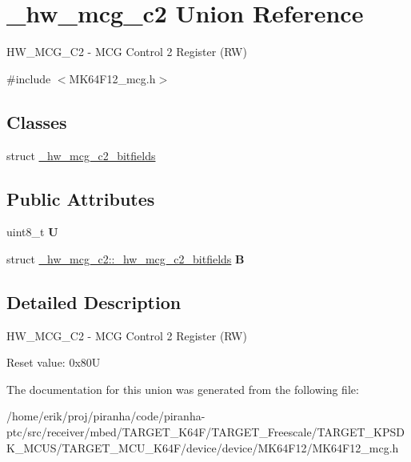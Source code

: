 \hypertarget{union__hw__mcg__c2}{}\section{\+\_\+hw\+\_\+mcg\+\_\+c2 Union Reference}
\label{union__hw__mcg__c2}


H\+W\+\_\+\+M\+C\+G\+\_\+\+C2 -\/ M\+CG Control 2 Register (RW)  




{\ttfamily \#include $<$M\+K64\+F12\+\_\+mcg.\+h$>$}

\subsection*{Classes}
\begin{DoxyCompactItemize}
\item 
struct \hyperlink{struct__hw__mcg__c2_1_1__hw__mcg__c2__bitfields}{\+\_\+hw\+\_\+mcg\+\_\+c2\+\_\+bitfields}
\end{DoxyCompactItemize}
\subsection*{Public Attributes}
\begin{DoxyCompactItemize}
\item 
uint8\+\_\+t {\bfseries U}\hypertarget{union__hw__mcg__c2_a11374059289d54ea6eb94f342826163e}{}\label{union__hw__mcg__c2_a11374059289d54ea6eb94f342826163e}

\item 
struct \hyperlink{struct__hw__mcg__c2_1_1__hw__mcg__c2__bitfields}{\+\_\+hw\+\_\+mcg\+\_\+c2\+::\+\_\+hw\+\_\+mcg\+\_\+c2\+\_\+bitfields} {\bfseries B}\hypertarget{union__hw__mcg__c2_a8e1b52b5548fedccdd27eeac436d4e11}{}\label{union__hw__mcg__c2_a8e1b52b5548fedccdd27eeac436d4e11}

\end{DoxyCompactItemize}


\subsection{Detailed Description}
H\+W\+\_\+\+M\+C\+G\+\_\+\+C2 -\/ M\+CG Control 2 Register (RW) 

Reset value\+: 0x80U 

The documentation for this union was generated from the following file\+:\begin{DoxyCompactItemize}
\item 
/home/erik/proj/piranha/code/piranha-\/ptc/src/receiver/mbed/\+T\+A\+R\+G\+E\+T\+\_\+\+K64\+F/\+T\+A\+R\+G\+E\+T\+\_\+\+Freescale/\+T\+A\+R\+G\+E\+T\+\_\+\+K\+P\+S\+D\+K\+\_\+\+M\+C\+U\+S/\+T\+A\+R\+G\+E\+T\+\_\+\+M\+C\+U\+\_\+\+K64\+F/device/device/\+M\+K64\+F12/M\+K64\+F12\+\_\+mcg.\+h\end{DoxyCompactItemize}
